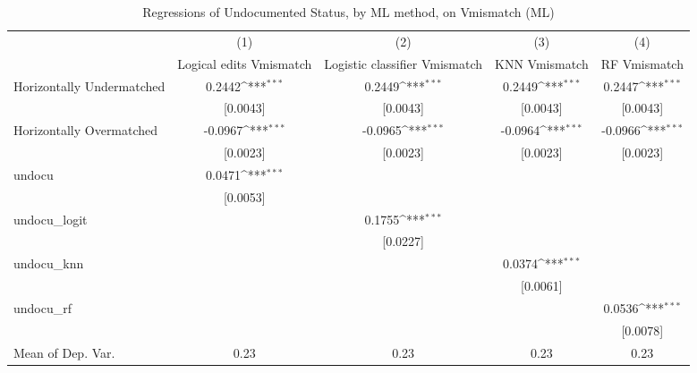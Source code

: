 \begin{table}[htbp]\centering
\def\sym#1{\ifmmode^{#1}\else\(^{#1}\)\fi}
\caption{Regressions of Undocumented Status, by ML method, on Vmismatch (ML)}
\begin{tabular}{l*{4}{c}}
\toprule
                    &\multicolumn{1}{c}{(1)}         &\multicolumn{1}{c}{(2)}         &\multicolumn{1}{c}{(3)}         &\multicolumn{1}{c}{(4)}         \\
                    &Logical edits Vmismatch         &Logistic classifier Vmismatch         &KNN Vmismatch         &RF Vmismatch         \\
\midrule
Horizontally Undermatched&      0.2442\sym{***}&      0.2449\sym{***}&      0.2449\sym{***}&      0.2447\sym{***}\\
                    &    [0.0043]         &    [0.0043]         &    [0.0043]         &    [0.0043]         \\
\addlinespace
Horizontally Overmatched&     -0.0967\sym{***}&     -0.0965\sym{***}&     -0.0964\sym{***}&     -0.0966\sym{***}\\
                    &    [0.0023]         &    [0.0023]         &    [0.0023]         &    [0.0023]         \\
\addlinespace
undocu              &      0.0471\sym{***}&                     &                     &                     \\
                    &    [0.0053]         &                     &                     &                     \\
\addlinespace
undocu\_logit        &                     &      0.1755\sym{***}&                     &                     \\
                    &                     &    [0.0227]         &                     &                     \\
\addlinespace
undocu\_knn          &                     &                     &      0.0374\sym{***}&                     \\
                    &                     &                     &    [0.0061]         &                     \\
\addlinespace
undocu\_rf           &                     &                     &                     &      0.0536\sym{***}\\
                    &                     &                     &                     &    [0.0078]         \\
\midrule
Mean of Dep. Var.   &        0.23         &        0.23         &        0.23         &        0.23         \\

\end{tabular}
\end{table}
